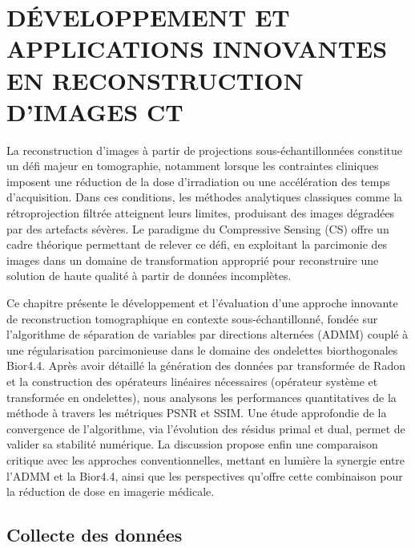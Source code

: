 \chapter{DÉVELOPPEMENT ET APPLICATIONS INNOVANTES EN RECONSTRUCTION D'IMAGES CT}
\label{chapitre4} 
La reconstruction d'images à partir de projections sous-échantillonnées constitue un défi majeur en tomographie, notamment lorsque les contraintes cliniques imposent une réduction de la dose d'irradiation ou une accélération des temps d'acquisition. Dans ces conditions, les méthodes analytiques classiques comme la rétroprojection filtrée atteignent leurs limites, produisant des images dégradées par des artefacts sévères. Le paradigme du Compressive Sensing (CS) offre un cadre théorique permettant de relever ce défi, en exploitant la parcimonie des images dans un domaine de transformation approprié pour reconstruire une solution de haute qualité à partir de données incomplètes.

Ce chapitre présente le développement et l'évaluation d'une approche innovante de reconstruction tomographique en contexte sous-échantillonné, fondée sur l'algorithme de séparation de variables par directions alternées (ADMM) couplé à une régularisation parcimonieuse dans le domaine des ondelettes biorthogonales Bior4.4. Après avoir détaillé la génération des données par transformée de Radon et la construction des opérateurs linéaires nécessaires (opérateur système et transformée en ondelettes), nous analysons les performances quantitatives de la méthode à travers les métriques PSNR et SSIM. Une étude approfondie de la convergence de l'algorithme, via l'évolution des résidus primal et dual, permet de valider sa stabilité numérique. La discussion propose enfin une comparaison critique avec les approches conventionnelles, mettant en lumière la synergie entre l'ADMM et la Bior4.4, ainsi que les perspectives qu'offre cette combinaison pour la réduction de dose en imagerie médicale.

\section{Collecte des données}
